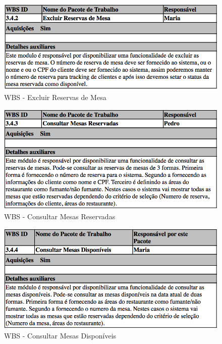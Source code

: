 \begin{figure}[H]
  \centering
  \includegraphics[width=1\textwidth]{softwareengineer/images/pmbok-wbs-342} 
  \caption{WBS - Excluir Reservas de Mesa}
  \label{fig:pmbok-wbs-342} 
\end{figure}

\begin{figure}[H]
  \centering
  \includegraphics[width=1\textwidth]{softwareengineer/images/pmbok-wbs-343} 
  \caption{WBS - Consultar Mesas Reservadas}
  \label{fig:pmbok-wbs-343} 
\end{figure}

\begin{figure}[H]
  \centering
  \includegraphics[width=1\textwidth]{softwareengineer/images/pmbok-wbs-344} 
  \caption{WBS - Consultar Mesas Disponíveis}
  \label{fig:pmbok-wbs-344} 
\end{figure}

